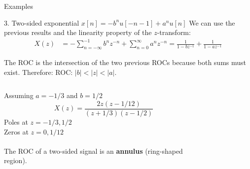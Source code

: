 \documentclass[10pt, handout]{beamer}
\begin{document}
\begin{frame}{Examples}

\begin{block}{3. Two-sided exponential $x[n] = -b^nu[-n-1] + a^nu[n]$}
	We can use the previous results and the linearity property of the $z$-transform:
	\vspace{-0.25cm}
	\begin{align*} 
	X(z) &= -\sum_{n=-\infty}^{-1} b^nz^{-n} + \sum_{n=0}^\infty a^nz^{-n} = \frac{1}{1-bz^{-1}} + \frac{1}{1-az^{-1}} 
	\end{align*}
	
	The ROC is the intersection of the two previous ROCs because both sums must exist. Therefore:
	ROC: $|b| < |z| < |a|$.

	\begin{columns}
		\begin{column}{0.5\textwidth}
			Assuming $a = -1/3$ and $b=1/2$
			\begin{equation*} 
			X(z) = \frac{2z(z-1/12)}{(z+1/3)(z-1/2)}
			\end{equation*}
			Poles at $z = -1/3, 1/2$\\
			Zeros at $z = 0, 1/12$
			~\\
			~\\
			The ROC of a two-sided signal is an \textbf{annulus} (ring-shaped region).
			
		\end{column}
		\begin{column}{0.5\textwidth}  %
			\begin{figure}
				\centering
				\resizebox{0.95\linewidth}{!}{}
				\label{fig:left_sided_exp}
			\end{figure}
		\end{column}
	\end{columns}
	
\end{block}
\end{frame}
\end{document}
